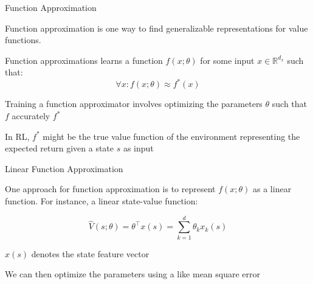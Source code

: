 \begin{frame}{Function Approximation}

Function approximation is one way to find generalizable representations for value functions. 

\blist
\item Function approximations learns a  function $f(x; \theta)$ for some input $x \in \mathbb{R}^{d_x}$ such that: 
\elist
\vspace{-2pt}
\[
\forall x: f(x; \theta) \approx f^*(x)
\]

\blist
    \item Training a function approximator involves optimizing the parameters $\theta$ such that $f$ accurately  $f^*$
    \item In RL, $f^*$ might be the true value function of the environment representing the expected return given a state $s$ as input
\elist

    
\end{frame}

\begin{frame}[t]{Linear Function Approximation}

One approach for function approximation is to represent $f(x; \theta)$ as a linear function. For instance, a linear state-value function:

\[
\hat{V}(s; \theta) = \theta^\top x(s) = \sum^d_{k=1}\theta_k x_k (s)
\]

\blist
    \item $x(s)$ denotes the state feature vector
    \item We can then optimize the parameters using a  like mean square error
\elist




\end{frame}


